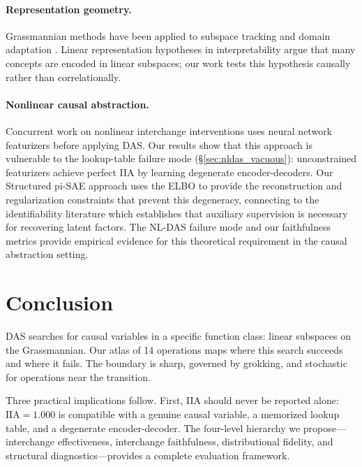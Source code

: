 \documentclass{article}
\newcommand{\IIA}{\mathrm{IIA}}
\begin{document}
\paragraph{Representation geometry.}
Grassmannian methods have been applied to subspace tracking and domain adaptation
\citep{edelman1998geometry, gopalan2011domain}. Linear representation hypotheses
in interpretability \citep{marks2023geometry, engels2024language,
park2024linear} argue that many concepts are encoded in linear subspaces; our
work tests this hypothesis causally rather than correlationally.

\paragraph{Nonlinear causal abstraction.}
Concurrent work on nonlinear interchange interventions
\citep{geiger2024causal} uses neural network featurizers before applying DAS.
Our results show that this approach is vulnerable to the lookup-table failure
mode (\S\ref{sec:nldas_vacuous}): unconstrained featurizers achieve perfect IIA
by learning degenerate encoder-decoders. Our Structured pi-SAE approach uses the
ELBO to provide the reconstruction and regularization constraints that prevent
this degeneracy, connecting to the identifiability literature
\citep{khemakhem2020variational, sutter2020multimodal} which establishes that
auxiliary supervision is necessary for recovering latent factors. The NL-DAS
failure mode and our faithfulness metrics provide empirical evidence for this
theoretical requirement in the causal abstraction setting.


\section{Conclusion}
\label{sec:conclusion}

DAS searches for causal variables in a specific function class: linear subspaces
on the Grassmannian. Our atlas of 14 operations maps where this search succeeds
and where it fails. The boundary is sharp, governed by grokking, and stochastic
for operations near the transition.

Three practical implications follow. First, IIA should never be reported alone:
$\IIA = 1.000$ is compatible with a genuine causal variable, a memorized lookup
table, and a degenerate encoder-decoder. The four-level hierarchy we propose---interchange effectiveness, interchange faithfulness, distributional fidelity,
and structural diagnostics---provides a complete evaluation framework.
\end{document}
